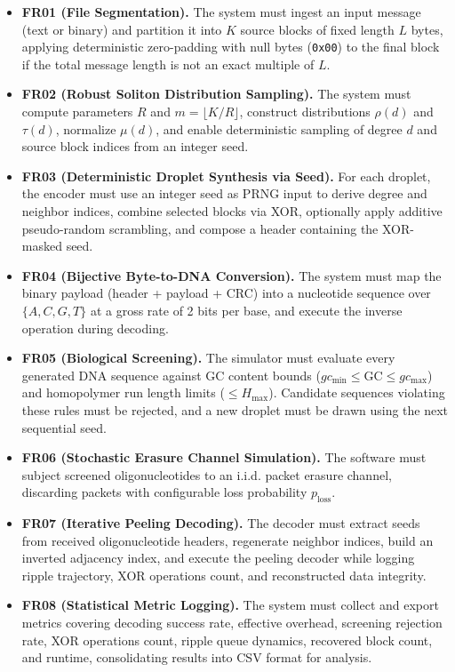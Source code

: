 \begin{itemize}
    \item \textbf{FR01 (File Segmentation).} The system must ingest an input message (text or binary) and partition it into $K$ source blocks of fixed length $L$ bytes, applying deterministic zero-padding with null bytes (\texttt{0x00}) to the final block if the total message length is not an exact multiple of $L$.

    \item \textbf{FR02 (Robust Soliton Distribution Sampling).} The system must compute parameters $R$ and $m = \lfloor K/R \rfloor$, construct distributions $\rho(d)$ and $\tau(d)$, normalize $\mu(d)$, and enable deterministic sampling of degree $d$ and source block indices from an integer seed.

    \item \textbf{FR03 (Deterministic Droplet Synthesis via Seed).} For each droplet, the encoder must use an integer seed as PRNG input to derive degree and neighbor indices, combine selected blocks via XOR, optionally apply additive pseudo-random scrambling, and compose a header containing the XOR-masked seed.

    \item \textbf{FR04 (Bijective Byte-to-DNA Conversion).} The system must map the binary payload (header + payload + CRC) into a nucleotide sequence over $\{A, C, G, T\}$ at a gross rate of 2 bits per base, and execute the inverse operation during decoding.

    \item \textbf{FR05 (Biological Screening).} The simulator must evaluate every generated DNA sequence against GC content bounds ($gc_{\min} \le \text{GC} \le gc_{\max}$) and homopolymer run length limits ($\le H_{\max}$). Candidate sequences violating these rules must be rejected, and a new droplet must be drawn using the next sequential seed.

    \item \textbf{FR06 (Stochastic Erasure Channel Simulation).} The software must subject screened oligonucleotides to an i.i.d. packet erasure channel, discarding packets with configurable loss probability $p_{\text{loss}}$.

    \item \textbf{FR07 (Iterative Peeling Decoding).} The decoder must extract seeds from received oligonucleotide headers, regenerate neighbor indices, build an inverted adjacency index, and execute the peeling decoder while logging ripple trajectory, XOR operations count, and reconstructed data integrity.

    \item \textbf{FR08 (Statistical Metric Logging).} The system must collect and export metrics covering decoding success rate, effective overhead, screening rejection rate, XOR operations count, ripple queue dynamics, recovered block count, and runtime, consolidating results into CSV format for analysis.
\end{itemize}

